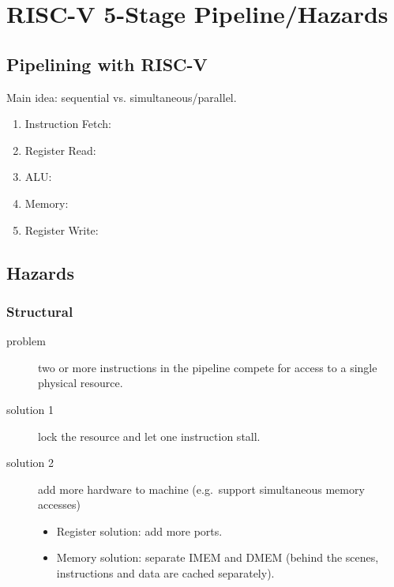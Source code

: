 \chapter{RISC-V 5-Stage Pipeline/Hazards}

\section{Pipelining with RISC-V}
Main idea: sequential vs. simultaneous/parallel.
\begin{enumerate}
    \item Instruction Fetch:
    \item Register Read:
    \item ALU:
    \item Memory:
    \item Register Write:
\end{enumerate}

\section{Hazards}
\subsection{Structural}
\begin{description}
	\item[problem] two or more instructions in the pipeline compete for access to a single physical resource.
	\item[solution 1] lock the resource and let one instruction stall.
	\item[solution 2] add more hardware to machine (e.g.~support simultaneous memory accesses)
	\begin{itemize}
		\item Register solution: add more ports.
		\item Memory solution: separate IMEM and DMEM (behind the scenes, instructions and data are cached separately).
	\end{itemize}
\end{description}

